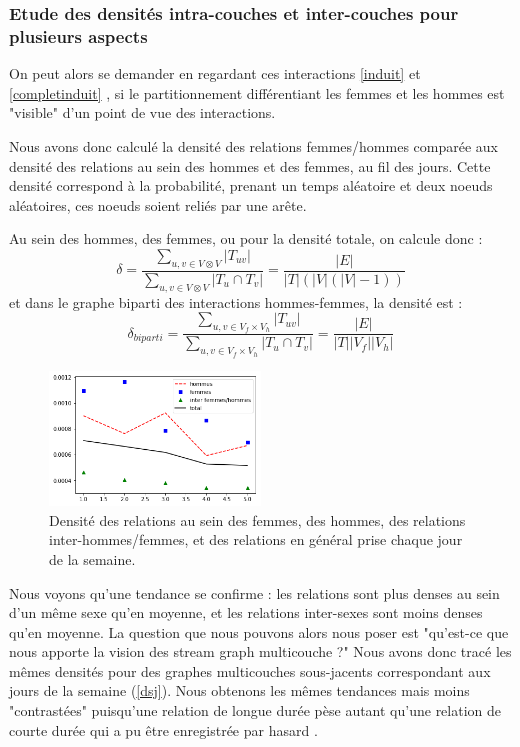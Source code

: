 \documentclass[11pt,a4paper]{article}
\theoremstyle{definition}
\theoremstyle{remark}
\theoremstyle{remark}
\def \stgm {stream graph multicouche}
\begin{document}
	
\subsubsection{Etude des densités intra-couches et inter-couches pour plusieurs aspects}
	On peut alors se demander en regardant ces interactions \cref{induit} et \cref{completinduit} , si le partitionnement différentiant les femmes et les hommes est "visible" d'un point de vue des interactions.

Nous avons donc calculé la densité des relations femmes/hommes comparée aux densité des relations au sein des hommes et des femmes, au fil des jours. Cette densité correspond à la probabilité, prenant un temps aléatoire et deux noeuds aléatoires, ces noeuds soient reliés par une arête.

Au sein des hommes, des femmes, ou pour la densité totale, on calcule donc :$$
\delta = \frac{\sum_{u,v \in V\otimes V} |T_{uv}|}{\sum_{u,v \in V \otimes V}|T_u\cap T_v|} = \frac{|E|}{|T|(|V|(|V|-1))}$$
et dans le graphe biparti des interactions hommes-femmes, la densité est :
$$\delta_{biparti}=\frac{\sum_{u,v \in V_f \times V_h} |T_{uv}|}{\sum_{u,v \in V_f \times V_h}|T_u\cap T_v|}=\frac{|E|}{|T||V_f||V_h|}$$
\begin{figure}[H]
	\centering
	\includegraphics[width=0.5\textwidth]{compfg.png}
	\caption{Densité des relations au sein des femmes, des hommes, des relations inter-hommes/femmes, et des relations en général prise chaque jour de la semaine.}
	\label{densitesemaine}
\end{figure}

Nous voyons qu'une tendance se confirme : les relations sont plus denses au sein d'un même sexe qu'en moyenne, et les relations inter-sexes sont moins denses qu'en moyenne. La question que nous pouvons alors nous poser est "qu'est-ce que nous apporte la vision des \stgm{} ?" Nous avons donc tracé les mêmes densités pour des graphes multicouches sous-jacents correspondant aux jours de la semaine (\cref{dsj}). Nous obtenons les mêmes tendances mais moins "contrastées" puisqu'une relation de longue durée \og pèse \fg{} autant qu'une relation de courte durée qui a pu être enregistrée \og par hasard \fg{}.
\end{document}
